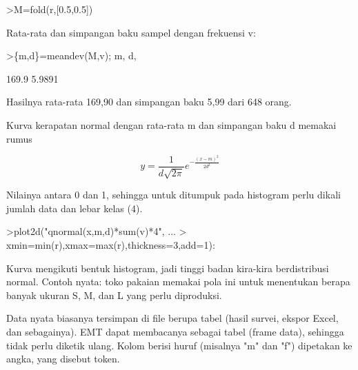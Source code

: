 \documentclass[a4paper,10pt]{article}
\begin{document}
\begin{eulernotebook}
\begin{eulercomment}
\begin{eulercomment}
\begin{eulercomment}
\begin{eulercomment}
\begin{eulercomment}
\begin{eulercomment}
\begin{eulercomment}
\end{eulercomment}
\begin{eulerprompt}
>M=fold(r,[0.5,0.5])
\end{eulerprompt}
\begin{euleroutput}
  [157.5,  161.5,  165.5,  169.5,  173.5,  177.5,  181.5,  185.5]
\end{euleroutput}
\begin{eulercomment}
Rata-rata dan simpangan baku sampel dengan frekuensi v:
\end{eulercomment}
\begin{eulerprompt}
>\{m,d\}=meandev(M,v); m, d,
\end{eulerprompt}
\begin{euleroutput}
  169.9
  5.9891
\end{euleroutput}
\begin{eulercomment}
Hasilnya rata-rata 169,90 dan simpangan baku 5,99 dari 648 orang.

Kurva kerapatan normal dengan rata-rata m dan simpangan baku d memakai rumus
\end{eulercomment}
\begin{eulerformula}
\[
y=\frac{1}{d\sqrt{2\pi}}e^{-\frac{(x-m)^2}{2d^2}}
\]
\end{eulerformula}
\begin{eulercomment}
Nilainya antara 0 dan 1, sehingga untuk ditumpuk pada histogram perlu dikali jumlah data
dan lebar kelas (4).
\end{eulercomment}
\begin{eulerprompt}
>plot2d("qnormal(x,m,d)*sum(v)*4", ...
>  xmin=min(r),xmax=max(r),thickness=3,add=1):
\end{eulerprompt}
\begin{eulercomment}
Kurva mengikuti bentuk histogram, jadi tinggi badan kira-kira berdistribusi normal.
Contoh nyata: toko pakaian memakai pola ini untuk menentukan berapa banyak ukuran S, M,
dan L yang perlu diproduksi.

\begin{eulercomment}
\begin{eulercomment}
\end{eulercomment}
\begin{eulercomment}
Data nyata biasanya tersimpan di file berupa tabel (hasil survei, ekspor Excel, dan
sebagainya). EMT dapat membacanya sebagai tabel (frame data), sehingga tidak perlu
diketik ulang. Kolom berisi huruf (misalnya "m" dan "f") dipetakan ke angka, yang disebut
token.


\end{eulercomment}
\end{eulercomment}
\end{eulercomment}
\end{eulercomment}
\end{eulercomment}
\end{eulercomment}
\end{eulercomment}
\end{eulercomment}
\end{eulercomment}
\end{eulernotebook}
\end{document}
